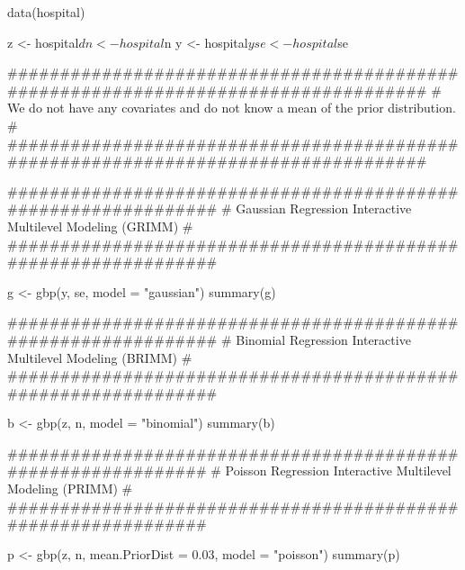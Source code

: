 \documentclass[a4paper]{book}
\begin{document}
\begin{Examples}
\begin{ExampleCode}

  data(hospital)

  z <- hospital$d
  n <- hospital$n
  y <- hospital$y
  se <- hospital$se
  
  ###################################################################################
  # We do not have any covariates and do not know a mean of the prior distribution. #
  ###################################################################################

    ###############################################################
    # Gaussian Regression Interactive Multilevel Modeling (GRIMM) #
    ###############################################################

    g <- gbp(y, se, model = "gaussian")
    summary(g)

    ###############################################################
    # Binomial Regression Interactive Multilevel Modeling (BRIMM) #
    ###############################################################

    b <- gbp(z, n, model = "binomial")
    summary(b)

    ##############################################################
    # Poisson Regression Interactive Multilevel Modeling (PRIMM) #
    ##############################################################

    p <- gbp(z, n, mean.PriorDist = 0.03, model = "poisson")
    summary(p)

\end{ExampleCode}
\end{Examples}
\printindex{}
\end{document}
